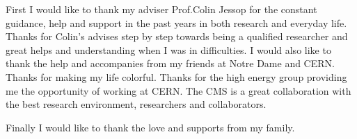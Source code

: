 \documentclass[final,numrefs,sort&compress,noinfo]{nddiss2e}
\begin{document}
\tableofcontents
{%
\let\oldnumberline\numberline%
\renewcommand{\numberline}{\figurename~\oldnumberline}%
\listoffigures%
}

{%
\let\oldnumberline\numberline%
\renewcommand{\numberline}{\tablename~\oldnumberline}%
\listoftables%
}

\begin{acknowledge}

First I would like to thank my adviser Prof.Colin Jessop for the constant guidance, help and support in the past years in both research and everyday life. Thanks for Colin's advises step by step towards being a qualified researcher and great helps and understanding when I was in difficulties. I would also like to thank the help and accompanies from my friends at Notre Dame and CERN. Thanks for making my life colorful. Thanks for the high energy group providing me the opportunity of working at CERN. The CMS is a great collaboration with the best research environment, researchers and collaborators. 

Finally I would like to thank the love and supports from my family.  

 


\end{acknowledge}

\mainmatter



\appendix


\backmatter              %

\end{document}
